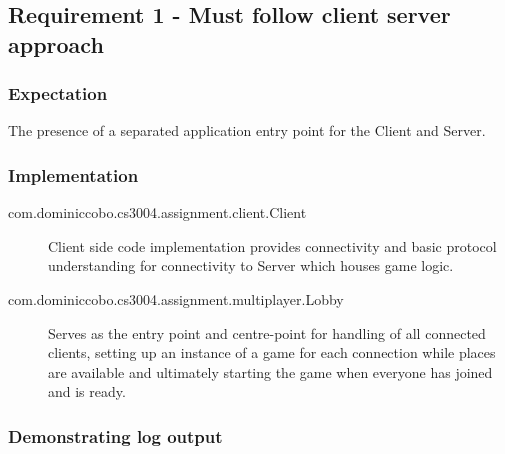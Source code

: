 \subsection{Requirement 1 - Must follow client server approach} 
		
\subsubsection{Expectation} 
The presence of a separated application entry point for the Client and Server. 

\subsubsection{Implementation}

{\begin{description}
	\item [com.dominiccobo.cs3004.assignment.client.Client] Client side code implementation provides connectivity and basic protocol understanding for connectivity to Server which houses game logic. 
	
	\item [com.dominiccobo.cs3004.assignment.multiplayer.Lobby] Serves as the entry point and centre-point for handling of all connected clients, setting up an instance of a game for each connection while places are available and ultimately starting the game when everyone has joined and is ready.

\end{description}} 

\subsubsection{Demonstrating log output} 




 

 

 